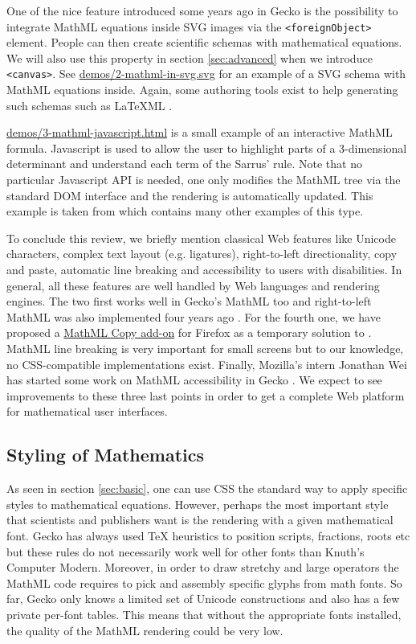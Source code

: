 One of the nice feature introduced some years ago in Gecko is the possibility
to integrate MathML equations inside SVG images via the {\tt <foreignObject>}
element. People can then create
scientific schemas with mathematical equations.
We will also use this property in section \ref{sec:advanced}
when we introduce {\tt <canvas>}.
See \href{http://fred-wang.github.io/MathUI2014/demos/2-mathml-in-svg.svg}{demos/2-mathml-in-svg.svg} for an example of a SVG schema with
MathML equations inside. Again, some authoring tools exist to help generating
such schemas such as LaTeXML \cite{LaTeXML}.

\href{http://fred-wang.github.io/MathUI2014/demos/3-mathml-javascript.html}{demos/3-mathml-javascript.html} is a small example of an
interactive MathML formula. Javascript is used to allow the user to highlight
parts of a 3-dimensional determinant and understand each term of the
Sarrus' rule. Note that no particular Javascript API is needed, one only
modifies the MathML tree via the standard DOM interface and the rendering
is automatically updated.
This example is taken from \cite{MathInEbooks} which contains
many other examples of this type.

To conclude this review, we briefly mention classical Web features like
Unicode characters, complex text layout (e.g. ligatures),
right-to-left directionality, copy and paste, automatic line breaking and
accessibility to users with disabilities.
In general, all these features are well handled by Web languages and rendering
engines. The two first works well in Gecko's MathML
too and right-to-left MathML was also implemented four years ago
\cite{BugzillaLTR}.
For the fourth one, we have proposed a
\href{https://addons.mozilla.org/en-US/firefox/addon/mathml-copy/}{MathML Copy add-on} for Firefox as a temporary solution to
\cite{BugzillaClipboard}. MathML line breaking \cite{BugzillaLinebreaking}
is very important
for small screens but to our knowledge, no CSS-compatible implementations exist.
Finally, Mozilla's intern Jonathan Wei has started some work on MathML
accessibility in Gecko \cite{BugzillaAccessibility} \cite{MozillaAccessibility}.
We expect to see improvements to these three last points in order to get a
complete Web platform for mathematical user interfaces.

\subsection{Styling of Mathematics}

As seen in section \ref{sec:basic}, one can use CSS the standard way to apply
specific styles to mathematical equations. However, perhaps the most important
style that scientists and publishers want is the rendering with a given
mathematical font. Gecko has always used TeX heuristics to position scripts,
fractions, roots etc but these rules do not necessarily work well for other
fonts than Knuth's Computer Modern. Moreover, in order to draw stretchy and
large operators the MathML code requires to pick and assembly specific glyphs
from math fonts. So far, Gecko only knows a limited set of Unicode constructions
and also has a
few private per-font tables. This means that without the appropriate
fonts installed, the quality of the MathML rendering could be very low.

